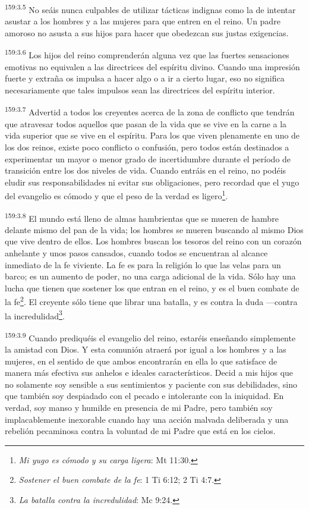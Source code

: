 \par
\textsuperscript{159:3.5} No seáis nunca culpables de utilizar tácticas indignas como la de intentar asustar a los hombres y a las mujeres para que entren en el reino. Un padre amoroso no asusta a sus hijos para hacer que obedezcan sus justas exigencias.

\par
\textsuperscript{159:3.6} Los hijos del reino comprenderán alguna vez que las fuertes sensaciones emotivas no equivalen a las directrices del espíritu divino. Cuando una impresión fuerte y extraña os impulsa a hacer algo o a ir a cierto lugar, eso no significa necesariamente que tales impulsos sean las directrices del espíritu interior.

\par
\textsuperscript{159:3.7} Advertid a todos los creyentes acerca de la zona de conflicto que tendrán que atravesar todos aquellos que pasan de la vida que se vive en la carne a la vida superior que se vive en el espíritu. Para los que viven plenamente en uno de los dos reinos, existe poco conflicto o confusión, pero todos están destinados a experimentar un mayor o menor grado de incertidumbre durante el período de transición entre los dos niveles de vida. Cuando entráis en el reino, no podéis eludir sus responsabilidades ni evitar sus obligaciones, pero recordad que el yugo del evangelio es cómodo y que el peso de la verdad es ligero\footnote{\textit{Mi yugo es cómodo y su carga ligera}: Mt 11:30.}.

\par
\textsuperscript{159:3.8} El mundo está lleno de almas hambrientas que se mueren de hambre delante mismo del pan de la vida; los hombres se mueren buscando al mismo Dios que vive dentro de ellos. Los hombres buscan los tesoros del reino con un corazón anhelante y unos pasos cansados, cuando todos se encuentran al alcance inmediato de la fe viviente. La fe es para la religión lo que las velas para un barco; es un aumento de poder, no una carga adicional de la vida. Sólo hay una lucha que tienen que sostener los que entran en el reino, y es el buen combate de la fe\footnote{\textit{Sostener el buen combate de la fe}: 1 Ti 6:12; 2 Ti 4:7.}. El creyente sólo tiene que librar una batalla, y es contra la duda ---contra la incredulidad\footnote{\textit{La batalla contra la incredulidad}: Mc 9:24.}.

\par
\textsuperscript{159:3.9} Cuando prediquéis el evangelio del reino, estaréis enseñando simplemente la amistad con Dios. Y esta comunión atraerá por igual a los hombres y a las mujeres, en el sentido de que ambos encontrarán en ella lo que satisface de manera más efectiva sus anhelos e ideales característicos. Decid a mis hijos que no solamente soy sensible a sus sentimientos y paciente con sus debilidades, sino que también soy despiadado con el pecado e intolerante con la iniquidad. En verdad, soy manso y humilde en presencia de mi Padre, pero también soy implacablemente inexorable cuando hay una acción malvada deliberada y una rebelión pecaminosa contra la voluntad de mi Padre que está en los cielos.

